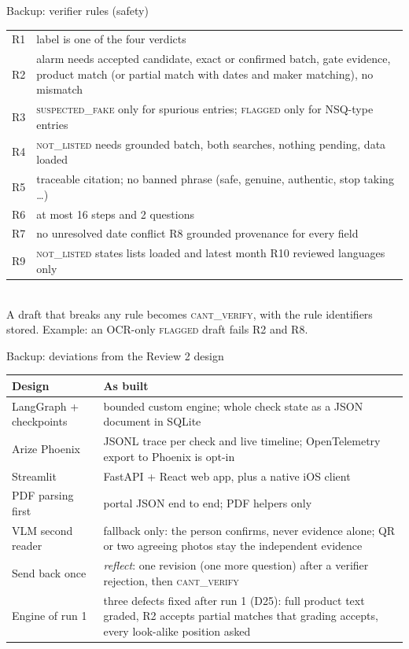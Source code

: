 \documentclass[aspectratio=169,11pt]{beamer}
\newcommand{\V}[1]{\textsc{\lowercase{#1}}}
\begin{document}
\begin{frame}{Backup: verifier rules (safety)}
\footnotesize
\begin{tabularx}{\textwidth}{@{}l X@{}}
\toprule
R1 & label is one of the four verdicts \\
R2 & alarm needs accepted candidate, exact or confirmed batch, gate evidence, product match (or partial match with dates and maker matching), no mismatch \\
R3 & \V{SUSPECTED\_FAKE} only for spurious entries; \V{FLAGGED} only for NSQ-type entries \\
R4 & \V{NOT\_LISTED} needs grounded batch, both searches, nothing pending, data loaded \\
R5 & traceable citation; no banned phrase (safe, genuine, authentic, stop taking \ldots) \\
R6 & at most 16 steps and 2 questions \\
R7 & no unresolved date conflict \quad R8 grounded provenance for every field \\
R9 & \V{NOT\_LISTED} states lists loaded and latest month \quad R10 reviewed languages only \\
\bottomrule
\end{tabularx}\\[2mm]
A draft that breaks any rule becomes \V{CANT\_VERIFY}, with the rule identifiers stored. Example: an OCR-only \V{FLAGGED} draft fails R2 and R8.
\end{frame}

\begin{frame}{Backup: deviations from the Review 2 design}
\footnotesize
\begin{tabularx}{\textwidth}{@{}l X@{}}
\toprule
Design & As built \\
\midrule
LangGraph + checkpoints & bounded custom engine; whole check state as a JSON document in SQLite \\
Arize Phoenix & JSONL trace per check and live timeline; OpenTelemetry export to Phoenix is opt-in \\
Streamlit & FastAPI + React web app, plus a native iOS client \\
PDF parsing first & portal JSON end to end; PDF helpers only \\
VLM second reader & fallback only: the person confirms, never evidence alone; QR or two agreeing photos stay the independent evidence \\
Send back once & \emph{reflect}: one revision (one more question) after a verifier rejection, then \V{CANT\_VERIFY} \\
Engine of run 1 & three defects fixed after run 1 (D25): full product text graded, R2 accepts partial matches that grading accepts, every look-alike position asked \\
\bottomrule
\end{tabularx}
\end{frame}
\end{document}
